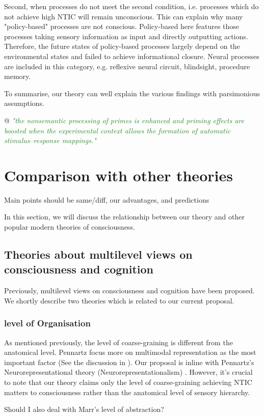 \documentclass[utf8]{article}
\newenvironment{ants}
			{
			 \begin{easylist}[itemize]
		 	}
			{
			\end{easylist}
			} %
\newcommand{\rewrite}[1]{\textcolor{ForestGreen}{\textit{"#1"}}\newline}
\newcommand{\ideaBox}[1]{
			    \vspace{2mm}
				\begin{tcolorbox}[enhanced,%
                    title=-,
                    center,
                    fontupper=\small,
                    lifted shadow={1mm}{-2mm}{3mm}{0.1mm}{black!50!white},%
                    boxrule=0.4pt,
                    width=9cm,
                    colback=Thistle!50!white,
                    sharp corners]
					#1
				\end{tcolorbox}
				\vspace{2mm}
			}
\newcommand{\rlstart}[1]{  %
        \setlength\changebarwidth{#1pt*2}  %
        \hspace*{-40pt}
        \cbstart{\textcolor{red}{\newline\textbf{iteration #1}}\newline}}
\begin{document}
		Second, when processes do not meet the second condition, i.e. processes which do not achieve high NTIC will remain unconscious. This can explain why many "policy-based" processes are not conscious. Policy-based here features those processes taking sensory information as input and directly outputting actions. Therefore, the future states of policy-based processes largely depend on the environmental states and failed to achieve informational closure. Neural processes are included in this category, e.g. reflexive neural circuit, blindsight, procedure memory. 
		
		To summarise, our theory can well explain the various findings with parsimonious assumptions. 
		
		
	    \begin{ants}
	        @ \rewrite{the nonsemantic processing of primes is enhanced and priming effects are boosted when the experimental context allows the formation of automatic stimulus–response mappings.}\cite{VandenBussche2009}
	    \end{ants}
		
        




	\section{Comparison with other theories}
		\ideaBox{Main points should be same/diff, our advantages, and predictions}
		In this section, we will discuss the relationship between our theory and other popular modern theories of consciousness. 

\rlstart{2}
		\subsection{Theories about multilevel views on consciousness and cognition}
        Previously, multilevel views on consciousness and cognition have been proposed. We shortly describe two theories which is  related to our current proposal.	%
        
            \subsubsection{level of Organisation \cite{wimsatt1994ontology}}
                As mentioned previously, the level of coarse-graining is different from the anatomical level.
                Pennartz focus more on multimodal representation as the most important factor (See the discussion in \cite{pennartz2015brain}). Our proposal is inline with Pennartz's Neurorepresentational  theory (Neurorepresentationalism) \cite{pennartz2018consciousness,pennartz2015brain}. However, it’s crucial to note that our theory claims only the level of coarse-graining achieving NTIC matters to consciousness rather than the anatomical level of sensory hierarchy. 
                \ideaBox{Should I also deal with Marr's level of abstraction?}
                
\end{document}

